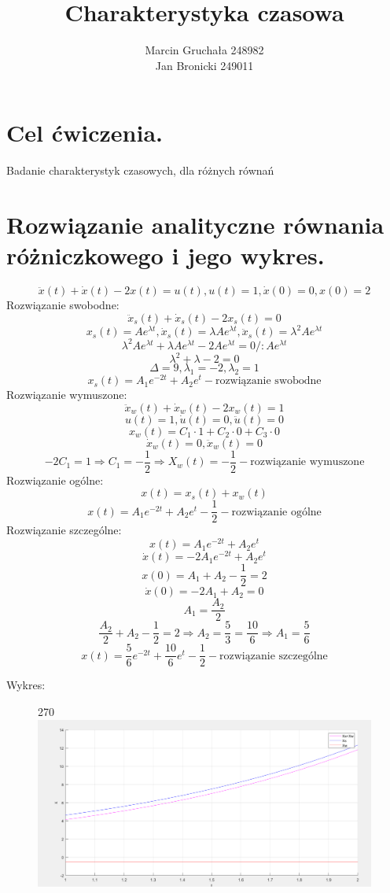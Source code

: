 \documentclass{article}
\title{Charakterystyka czasowa}
\author{Marcin Gruchała 248982\\
Jan Bronicki 249011\\}
\date{}
\begin{document}
\maketitle
\section{Cel ćwiczenia.}
Badanie charakterystyk czasowych, dla różnych równań
\section{Rozwiązanie analityczne równania różniczkowego i jego wykres.}
$$
\ddot{x}(t)+\dot{x}(t)-2x(t)=u(t), u(t)=1, \dot{x}(0)=0, x(0)=2
$$
Rozwiązanie swobodne:
$$
\ddot{x}_s(t)+\dot{x}_s(t)-2x_s(t)=0
$$
$$
x_s(t)=Ae^{\lambda t}, \dot{x}_s(t)=\lambda Ae^{\lambda t}, \ddot{x}_s(t)=\lambda^2 Ae^{\lambda t}
$$
$$
\lambda^2 Ae^{\lambda t}+\lambda Ae^{\lambda t}-2Ae^{\lambda t}=
0/:Ae^{\lambda t}
$$
$$
\lambda^2+\lambda-2=0
$$
$$
\Delta=9, \lambda_1=-2, \lambda_2=1
$$
$$
x_s(t)=A_1e^{-2t}+A_2e^{t} - \text{rozwiązanie swobodne}
$$
Rozwiązanie wymuszone:
$$
\ddot{x}_w(t)+\dot{x}_w(t)-2x_w(t)=1
$$
$$
u(t)=1,\dot{u}(t)=0 ,\ddot{u}(t)=0
$$
$$
x_w(t)=C_1\cdot1+C_2\cdot0+C_3\cdot0
$$
$$
\dot{x}_w(t)=0,\ddot{x}_w(t)=0
$$
$$
-2C_1=1 \Rightarrow C_1=-\frac{1}{2} \Rightarrow X_w(t)=-\frac{1}{2} - \text{rozwiązanie wymuszone}
$$
Rozwiązanie ogólne: 
$$
x(t)=x_s(t)+x_w(t)
$$
$$
x(t)=A_1e^{-2t}+A_2e^{t}-\frac{1}{2}-\text{rozwiązanie ogólne}
$$
Rozwiązanie szczególne:
$$
x(t)=A_1e^{-2t}+A_2e^{t}
$$
$$
\dot{x}(t)=-2A_1e^{-2t}+A_2e^{t}
$$
$$
x(0)=A_1+A_2-\frac{1}{2}=2
$$
$$
\dot{x}(0)=-2A_1+A_2=0
$$
$$
A_1=\frac{A_2}{2}
$$
$$
\frac{A_2}{2}+A_2-\frac{1}{2}=2 \Rightarrow A_2=\frac{5}{3}=\frac{10}{6}
\Rightarrow A_1=\frac{5}{6}
$$
$$
x(t)=\frac{5}{6}e^{-2t}+\frac{10}{6}e^{t}-\frac{1}{2}-\text{rozwiązanie szczególne}
$$



\newpage
Wykres:
\begin{figure}[h!]
    \centering
     \begin{turn}{270}
    \includegraphics[width=1.3\textwidth]{rozwiazanie_analityczne_wykres.png}
    \end{turn}
    \label{fig:my_label}
\end{figure}
\end{document}
